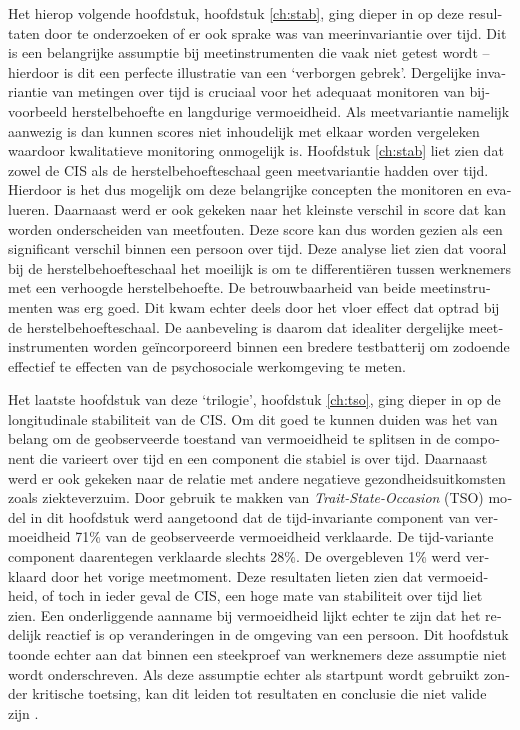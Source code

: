 \begin{otherlanguage}{dutch}
Het hierop volgende hoofdstuk, hoofdstuk \ref{ch:stab}, ging dieper in op deze resultaten door te onderzoeken of er ook sprake was van meerinvariantie over tijd. Dit is een belangrijke assumptie bij meetinstrumenten die vaak niet getest wordt -- hierdoor is dit een perfecte illustratie van een `verborgen gebrek'. Dergelijke invariantie van metingen over tijd is cruciaal voor het adequaat monitoren van bijvoorbeeld herstelbehoefte en langdurige vermoeidheid. Als meetvariantie namelijk aanwezig is dan kunnen scores niet inhoudelijk met elkaar worden vergeleken waardoor kwalitatieve monitoring onmogelijk is. Hoofdstuk \ref{ch:stab} liet zien dat zowel de CIS als de herstelbehoefteschaal geen meetvariantie hadden over tijd. Hierdoor is het dus mogelijk om deze belangrijke concepten the monitoren en evalueren. Daarnaast werd er ook gekeken naar het kleinste verschil in score dat kan worden onderscheiden van meetfouten. Deze score kan dus worden gezien als een significant verschil binnen een persoon over tijd. Deze analyse liet zien dat vooral bij de herstelbehoefteschaal het moeilijk is om te differenti\"eren tussen werknemers met een verhoogde herstelbehoefte. De betrouwbaarheid van beide meetinstrumenten was erg goed. Dit kwam echter deels door het vloer effect dat optrad bij de herstelbehoefteschaal. De aanbeveling is daarom dat idealiter dergelijke meetinstrumenten worden ge\"incorporeerd binnen een bredere testbatterij om zodoende effectief te effecten van de psychosociale werkomgeving te meten. 

Het laatste hoofdstuk van deze `trilogie', hoofdstuk \ref{ch:tso}, ging dieper in op de longitudinale stabiliteit van de CIS. Om dit goed te kunnen duiden was het van belang om de geobserveerde toestand van vermoeidheid te splitsen in de component die varieert over tijd en een component die stabiel is over tijd. Daarnaast werd er ook gekeken naar de relatie met andere negatieve gezondheidsuitkomsten zoals ziekteverzuim. Door gebruik te makken van \textit{Trait-State-Occasion} (TSO) model  \parencite{Prenoveau_2011,Prenoveau_2016} in dit hoofdstuk werd aangetoond dat de tijd-invariante component van vermoeidheid 71\% van de geobserveerde vermoeidheid verklaarde. De tijd-variante component daarentegen verklaarde slechts 28\%. De overgebleven 1\% werd verklaard door het vorige meetmoment. Deze resultaten lieten zien dat vermoeidheid, of toch in ieder geval de CIS, een hoge mate van stabiliteit over tijd liet zien. Een onderliggende aanname bij vermoeidheid lijkt echter te zijn dat het redelijk reactief is op veranderingen in de omgeving van een persoon. Dit hoofdstuk toonde echter aan dat binnen een steekproef van werknemers deze assumptie niet wordt onderschreven. Als deze assumptie echter als startpunt wordt gebruikt zonder kritische toetsing, kan dit leiden tot resultaten en conclusie die niet valide zijn \parencite{Hamaker_2015}.


\end{otherlanguage}
